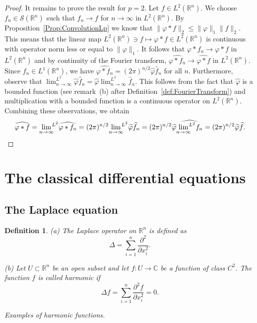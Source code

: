 \documentclass[12pt, oneside, a4paper]{article}
\theoremstyle{dfn}
\newtheorem{dfn}[thm]{Definition}
\def \S {\ensuremath{\mathcal{S}}}
\def \S {\ensuremath{\mathcal{S}}}
\def\Rbb{\ensuremath{\mathbb{R}}}
\providecommand{\norm}[1]{\lVert#1\rVert}
\newcommand{\Com}{\mathbb{C}}
\begin{document}
\begin{proof}
It remains to prove the result for $p = 2$. Let $f \in L^2(\Rbb^n)$. We choose $f_n \in \S(\Rbb^n)$ such that $f_n \to f$ for $n \to \infty$ in $L^2(\Rbb^n)$. By Proposition~\ref{Prop:ConvolutionLp} we know that $\norm{\varphi * f}_2 \leqslant \norm{\varphi}_1 \norm{f}_2$. This means that the linear map $L^2(\Rbb^n) \ni f \mapsto \varphi * f \in L^2(\Rbb^n)$ is continuous with operator norm less or equal to $\norm{\varphi}_1$. It follows that $\varphi * f_n \to \varphi * f$ in $L^2(\Rbb^n)$ and by continuity of the Fourier transform, $\widehat{\varphi * f_n} \to \widehat{\varphi * f}$ in $L^2(\Rbb^n)$. Since $f_n \in L^1(\Rbb^n)$, we have $\widehat{\varphi * f_n} = (2\pi)^{n/2} \widehat{\varphi} \widehat{f}_n$ for all $n$. Furthermore, observe that $\lim_{n \to \infty}^{L^2} \widehat{\varphi} \widehat{f}_n = \widehat{\varphi} \lim_{n \to \infty}^{L^2} \widehat{f}_n$. This follows from the fact that $\widehat{\varphi}$ is a bounded function (see remark~(b) after Definition~\ref{def:FourierTransform}) and 
multiplication with a bounded function is a continuous operator on $L^2(\Rbb^n)$. Combining these observations, we obtain
\[
\widehat{\varphi * f}
= {\lim_{n\to\infty}}^{\!\!L^2} \widehat{\varphi * f_n}
= (2\pi)^{n/2} {\lim_{n\to\infty}}^{\!\!L^2} \widehat{\varphi} \widehat{f}_n
= (2\pi)^{n/2} \widehat{\varphi} \widehat{{\lim_{n\to\infty}}^{\!\!L^2} f_n}
= (2\pi)^{n/2} \widehat{\varphi} \widehat{f}.
\qedhere
\]
\end{proof}

\section{The classical differential equations}

\subsection{The Laplace equation}

\begin{dfn}
(a) The Laplace operator on $\Rbb^n$ is defined as
\[
\Delta = \sum_{i=1}^n \frac{\partial^2}{\partial x_i^2}.
\]

(b) Let $U \subset \Rbb^n$ be an open subset and let $f \colon U \to \Com$ be a function of class $C^2$. The function $f$ is called harmonic if
\[
\Delta f = \sum_{i=1}^n \frac{\partial^2 f}{\partial x_i^2} = 0.
\]
\end{dfn}

\noindent\emph{Examples of harmonic functions.}
\end{document}
